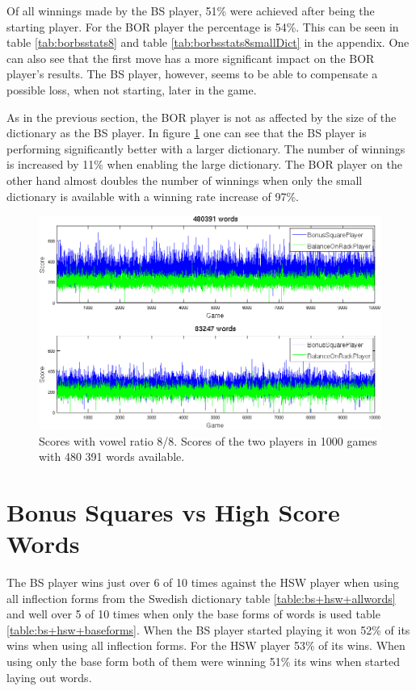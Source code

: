 \documentclass[a4paper, 12pt]{report}
\begin{document}
Of all winnings made by the BS player, 51\% were achieved after being the starting player. For the BOR player the percentage is 54\%. This can be seen in table \ref{tab:borbsstats8} and table \ref{tab:borbsstats8smallDict} in the appendix. One can also see that the first move has a more significant impact on the BOR player's results. The BS player, however, seems to be able to compensate a possible loss, when not starting, later in the game.

As in the previous section, the BOR player is not as affected by the size of the dictionary as the BS player. In figure \ref{fig:bonusBalanceLargeDict} one can see that the BS player is performing significantly better with a larger dictionary. The number of winnings is increased by 11\% when enabling the large dictionary. The BOR player on the other hand almost doubles the number of winnings when only the small dictionary is available with a winning rate increase of 97\%. 



\begin{figure}[h]
\centering
\includegraphics[scale=0.4]{BonusBalance8vow_bothDict_cropped}
\caption {Scores with vowel ratio 8/8. Scores of the two players in 1000 games with 480 391 words available.}
\label{fig:bonusBalanceLargeDict}
\end{figure}



\section{Bonus Squares vs High Score Words}
\label{sec:bonusHigh}
The BS player wins just over 6 of 10 times against the HSW player when using all inflection forms from the Swedish dictionary table \ref{table:bs+hsw+allwords} and well over 5 of 10 times when only the base forms of words is used table \ref{table:bs+hsw+baseforms}. When the BS player started playing it won 52\% of its wins when using all inflection forms. For the HSW player 53\% of its wins. When using only the base form both of them were winning 51\% its wins when started laying out words.
\end{document}
